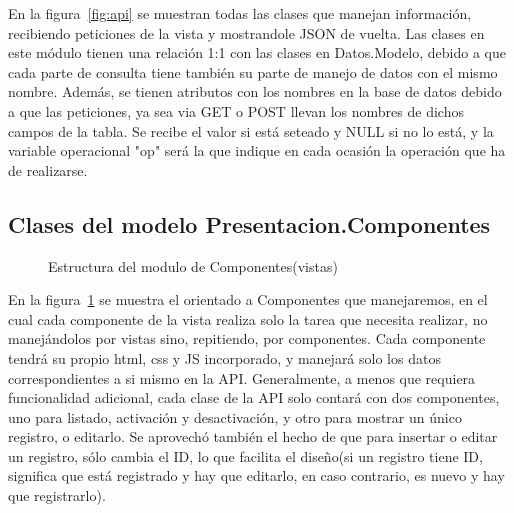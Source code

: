     En la figura~\ref{fig:api} se muestran todas las clases que manejan información, recibiendo peticiones de la vista y mostrandole JSON de vuelta. Las clases en este módulo tienen una relación 1:1 con las clases en Datos.Modelo, debido a que cada parte de consulta tiene también su parte de manejo de datos con el mismo nombre. Además, se tienen atributos con los nombres en la base de datos debido a que las peticiones, ya sea via GET o POST llevan los nombres de dichos campos de la tabla. Se recibe el valor si está seteado y NULL si no lo está, y la variable operacional "op" será la que indique en cada ocasión la operación que ha de realizarse. 
    
    \subsection{Clases del modelo Presentacion.Componentes}
    
    \begin{figure}[htbp!]
    	\begin{center}
    		\caption{Estructura del modulo de Componentes(vistas)}
    		\label{fig:componentes}
    	\end{center}
    \end{figure}
    
    En la figura~\ref{fig:componentes} se muestra el orientado a Componentes que manejaremos, en el cual cada componente de la vista realiza solo la tarea que necesita realizar, no manejándolos por vistas sino, repitiendo, por componentes. Cada componente tendrá su propio html, css y JS incorporado, y manejará solo los datos correspondientes a si mismo en la API. Generalmente, a menos que requiera funcionalidad adicional, cada clase de la API solo contará con dos componentes, uno para listado, activación y desactivación, y otro para mostrar un único registro, o editarlo. Se aprovechó también el hecho de que para insertar o editar un registro, sólo cambia el ID, lo que facilita el diseño(si un registro tiene ID, significa que está registrado y hay que editarlo, en caso contrario, es nuevo y hay que registrarlo).
    
